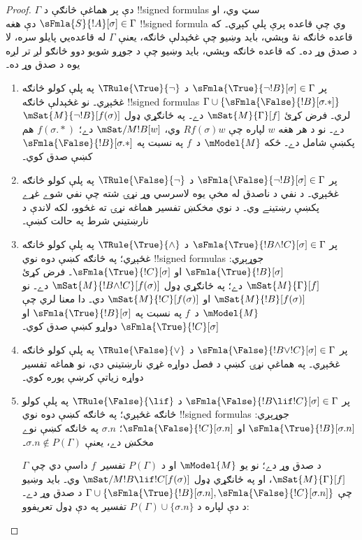 \documentclass[../../../include/open-logic-section]{subfiles}
\begin{document}
\begin{proof}
$\Gamma$ دې پر هماغې څانګې د !!{signed formula}s سټ وي، او
$\sFmla{S}{!A}[\sigma] \in \Gamma$ دې هغه !!{signed formula}
وي چې قاعده پرې پلې کېږي۔ که قاعده څانګه نۀ وېشي، بايد وښيو
چې غځېدلې څانګه، يعنې $\Gamma$ له قاعده‌يي پايلو سره، لا د
صدق وړ ده۔ که قاعده څانګه وېشي، بايد وښيو چې د جوړو شويو دوو
څانګو لږ تر لږه يوه د صدق وړ ده۔
\begin{enumerate}
\item پر $\sFmla{\True}{\lnot !B}[\sigma] \in \Gamma$ د
  $\TRule{\True}{\lnot}$ په پلې کولو څانګه غځېږي۔ نو غځېدلې
  څانګه !!{signed formula}s $\Gamma \cup
  \{\sFmla{\False}{!B}[\sigma.{*}]\}$ لري۔ فرض کړئ
  $\mSat{M}{\Gamma}[f]$ دے۔ په ځانګړي ډول
  $\mSat{M}{\lnot !B}[f(\sigma)]$ دے۔ نو د هر هغه $w$ لپاره
  چې $Rf(\sigma)w$ وي، $\mSat/{M}{!B}[w]$ دے؛
  $f(\sigma.{*})$ هم پکښې شامل دے۔ ځکه $\mModel{M}$ د~$f$
  په نسبت په $\sFmla{\False}{!B}[\sigma.{*}]$ کښې صدق کوي۔
\item پر $\sFmla{\False}{\lnot !B}[\sigma] \in \Gamma$ د
  $\TRule{\False}{\lnot}$ په پلې کولو څانګه غځېږي۔ د نفي
  د ناصدق له مخې يوه لاسرسي وړ نړۍ شته چې نفي شوے غړے پکښې
  رښتينے وي۔ د نوي مخکښ تفسير هماغه نړۍ ته غځوو، لکه لاندې
  د نارښتيني شرط په حالت کښې۔
\item پر $\sFmla{\True}{!B \land !C}[\sigma] \in \Gamma$ د
  $\TRule{\True}{\land}$ په پلې کولو څانګه غځېږي؛ په څانګه
  کښې دوه نوي !!{signed formula}s جوړېږي:
  $\sFmla{\True}{!B}[\sigma]$ او $\sFmla{\True}{!C}[\sigma]$۔
  فرض کړئ $\mSat{M}{\Gamma}[f]$ دے؛ په ځانګړي ډول
  $\mSat{M}{!B \land !C}[f(\sigma)]$ دے۔ نو
  $\mSat{M}{!B}[f(\sigma)]$ او $\mSat{M}{!C}[f(\sigma)]$
  دي۔ دا معنا لري چې $\mModel{M}$ د~$f$ په نسبت په
  $\sFmla{\True}{!B}[\sigma]$ او
  $\sFmla{\True}{!C}[\sigma]$ دواړو کښې صدق کوي۔
\item پر $\sFmla{\False}{!B \lor !C}[\sigma] \in \Gamma$ د
  $\TRule{\False}{\lor}$ په پلې کولو څانګه غځېږي۔ په
  هماغې نړۍ کښې د فصل دواړه غړي نارښتيني دي، نو هماغه تفسير
  دواړه زياتې کرښې پوره کوي۔
\item پر $\sFmla{\False}{!B \lif !C}[\sigma] \in \Gamma$ د
  $\TRule{\False}{\lif}$ په پلې کولو څانګه غځېږي؛ په څانګه
  کښې دوه نوي !!{signed formula}s جوړېږي:
  $\sFmla{\True}{!B}[\sigma.n]$ او
  $\sFmla{\False}{!C}[\sigma.n]$؛ $\sigma.n$ په څانګه کښې
  نوے مخکښ دے، يعنې $\sigma.n \notin P(\Gamma)$۔
  
  $\Gamma$ د صدق وړ دے؛ نو يو $\mModel{M}$ او د $P(\Gamma)$
  تفسير~$f$ داسې دي چې $\mSat{M}{\Gamma}[f]$، او په ځانګړي
  ډول $\mSat/{M}{!B \lif !C}[f(\sigma)]$ وي۔ بايد وښيو چې
  $\Gamma \cup \{\sFmla{\True}{!B}[\sigma.n],\sFmla{\False}{!C}[\sigma.n]\}$
  د صدق وړ دے۔ د دې لپاره د $P(\Gamma)
  \cup \{\sigma.n\}$ تفسير په دې ډول تعريفوو:
  

\end{enumerate}
\end{proof}
\end{document}
